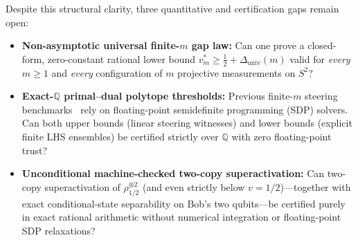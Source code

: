 \documentclass[11pt,a4paper]{article}
\theoremstyle{definition}
\theoremstyle{remark}
\newcommand{\QQ}{\mathbb{Q}}
\begin{document}
Despite this structural clarity, three quantitative and certification gaps remain open:
\begin{itemize}[leftmargin=1.6em,itemsep=2pt]
  \item \textbf{Non-asymptotic universal finite-$m$ gap law:} Can one prove a closed-form, zero-constant rational lower bound $v_m^* \ge \frac{1}{2} + \Delta_{\mathrm{univ}}(m)$ valid for \emph{every} $m \ge 1$ and \emph{every} configuration of $m$ projective measurements on $S^2$?
  \item \textbf{Exact-$\QQ$ primal--dual polytope thresholds:} Previous finite-$m$ steering benchmarks~\cite{saunders2010experimental,nguyen2016necessary,cavalcanti2017quantum} rely on floating-point semidefinite programming (SDP) solvers. Can both upper bounds (linear steering witnesses) and lower bounds (explicit finite LHS ensembles) be certified strictly over $\QQ$ with zero floating-point trust?
  \item \textbf{Unconditional machine-checked two-copy superactivation:} Can two-copy superactivation of $\rho_{1/2}^{\otimes 2}$ (and even strictly below $v = 1/2$)---together with exact conditional-state separability on Bob's two qubits---be certified purely in exact rational arithmetic without numerical integration or floating-point SDP relaxations?
\end{itemize}
\end{document}
